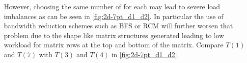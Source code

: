 However, choosing the same number of \levels for each \levelGroup may lead to severe load imbalances as can be seen in \cref{fig:2d-7pt_d1_d2}. In particular the use of bandwidth reduction schemes such as BFS or RCM will further worsen that problem due to the shape like matrix structures generated leading to low workload for matrix rows at the top and bottom of the matrix. Compare \eg $T(1)$ and $T(7)$ with  $T(3)$ and $T(4)$ in \cref{fig:2d-7pt_d1_d2}.
  
